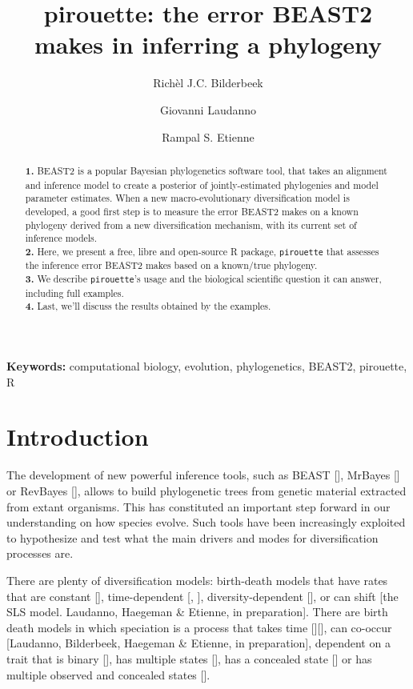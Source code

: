 \documentclass{article}
\title{pirouette: the error BEAST2 makes in inferring a phylogeny}
\author[1]{Rich\`el J.C. Bilderbeek}
\author[1]{Giovanni Laudanno}
\author[1]{Rampal S. Etienne}
\affil[1]{Groningen Institute for Evolutionary Life Sciences, University of Groningen, Groningen, The Netherlands}
\begin{document}
\maketitle

\begin{abstract}

  \textbf{1. }
    BEAST2 is a popular Bayesian phylogenetics software tool,
    that takes an alignment and inference model to create a
    posterior of jointly-estimated phylogenies and model parameter estimates.
    When a new macro-evolutionary diversification model is developed,
    a good first step is to measure the error BEAST2 makes on a known
    phylogeny derived from a new diversification mechanism, 
    with its current set of inference models. \\
  \textbf{2. }
    Here, we present a free, libre and open-source R package, \verb;pirouette;
    that assesses the inference error BEAST2 makes based on a known/true 
    phylogeny. \\
  \textbf{3. }
    We describe \verb;pirouette;'s usage and the biological scientific
    question it can answer, including full examples. \\
  \textbf{4. }
    Last, we'll discuss the results obtained by the examples. \\
\end{abstract}

{\bf Keywords:} computational biology, evolution, phylogenetics, BEAST2, pirouette, R

\section{Introduction}

The development of new powerful inference tools, 
such as BEAST [\cite{drummond2007beast}], MrBayes [\cite{huelsenbeck2001mrbayes}]
or RevBayes [\cite{hohna2016revbayes}], 
allows to build phylogenetic trees 
from genetic material extracted from extant organisms.
This has constituted an important step forward 
in our understanding on how species evolve.
Such tools have been increasingly exploited to hypothesize 
and test what the main drivers and modes for diversification processes are.

There are plenty of diversification models: 
birth-death models that have rates that are 
constant [\cite{nee1994reconstructed}], 
time-dependent [\cite{nee1994reconstructed}, \cite{rabosky2008explosive}], 
diversity-dependent [\cite{etienne2011diversity}],
or can shift [the SLS model. Laudanno, Haegeman \& Etienne, in preparation].
There are birth death models in which speciation is a process that 
takes time [\cite{rosindell2010protracted}][\cite{etienne2012prolonging}],
can co-occur [Laudanno, Bilderbeek, Haegeman \& Etienne, in preparation],
dependent on a trait that is binary [\cite{maddison2007estimating}], 
has multiple states [\cite{fitzjohn2012diversitree}],
has a concealed state [\cite{beaulieu2016detecting}] 
or has multiple observed and concealed states [\cite{herrera2018detecting}]. 
\end{document}
